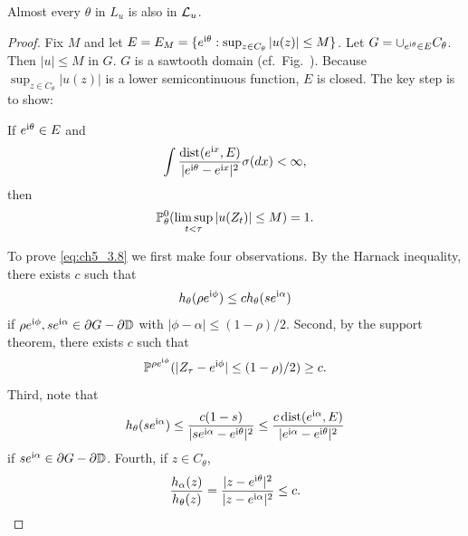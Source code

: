 \begin{proposition}\label{prop:ch5_3.3}
Almost every $\theta$ in $L_u$ is also in $\LC_u$.
\end{proposition}

\begin{proof}
Fix $M$ and let $E = E_M = \{e^{\im\theta} : \sup_{z\in C_\theta} |u(z)| \leq M\}$. Let $G = \cup_{e^{\im\theta}\in E}C_\theta$. Then $|u| \leq M$ in $G$. $G$ is a sawtooth domain (cf.\ Fig.\ ). Because $\sup_{z\in C_\theta} |u(z)|$ is a lower semicontinuous function, $E$ is closed. The key step is to show:

If $e^{\im\theta} \in E$ and
\mpagebreak
\begin{equation}\label{eq:ch5_3.7}
    \int \frac{\dist(e^{\im x},E)}{|e^{\im\theta}-e^{\im x}|^2}\sigma(dx) < \infty,
\end{equation}
then
\begin{equation}\label{eq:ch5_3.8}
    \P_\theta^0(\limsup_{t<\tau} |u(Z_t)| \leq M) = 1.
\end{equation}

To prove \eqref{eq:ch5_3.8} we first make four observations. By the Harnack inequality, there exists $c$ such that
\begin{equation}\label{eq:ch5_3.9}
    h_\theta(\rho e^{\im\phi}) \leq ch_\theta(se^{\im\alpha})
\end{equation}
if $\rho e^{\im\phi}, se^{\im\alpha} \in \partial G - \partial\D$ with $|\phi - \alpha| \leq (1-\rho)/2$. Second, by the support theorem, there exists $c$ such that
\begin{equation}\label{eq:ch5_3.10}
    \P^{\rho e^{\im\phi}}(|Z_\tau - e^{\im\phi}| \leq (1-\rho)/2) \geq c.
\end{equation}
Third, note that
\begin{equation}\label{eq:ch5_3.11}
    h_\theta(se^{\im\alpha}) \leq \frac{c(1-s)}{|se^{\im\alpha} - e^{\im\theta}|^2} \leq \frac{c\dist(e^{\im\alpha},E)}{|e^{\im\alpha} - e^{\im\theta}|^2}
\end{equation}
if $se^{\im\alpha} \in \partial G - \partial\D$. Fourth, if $z \in C_\theta$,
\begin{equation}\label{eq:ch5_3.12}
    \frac{h_\alpha(z)}{h_\theta(z)} = \frac{|z - e^{\im\theta}|^2}{|z - e^{\im\alpha}|^2} \leq c.
\end{equation}


\end{proof}

